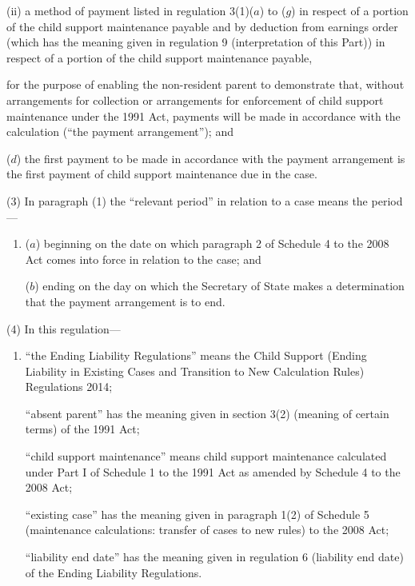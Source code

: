 \documentclass[12pt,a4paper]{article}
\begin{document}
\begin{enumerate}
\begin{enumerate}
    (ii)
    a method of payment listed in regulation 3(1)($a$) to ($g$) in respect of a portion of the child support maintenance payable and by deduction from earnings order (which has the meaning given in regulation 9 (interpretation of this Part)) in respect of a portion of the child support maintenance payable,
\end{enumerate}
    for the purpose of enabling the non-resident parent to demonstrate that, without arrangements for collection or arrangements for enforcement of child support maintenance under the 1991 Act, payments will be made in accordance with the calculation (“the payment arrangement”); and

    ($d$)
    the first payment to be made in accordance with the payment arrangement is the first payment of child support maintenance due in the case.
\end{enumerate}

    (3)
    In paragraph (1) the “relevant period” in relation to a case means the period—
\begin{enumerate}\item[]
    ($a$)
    beginning on the date on which paragraph 2 of Schedule 4 to the 2008 Act comes into force in relation to the case; and

    ($b$)
    ending on the day on which the Secretary of State makes a determination that the payment arrangement is to end.
\end{enumerate}

    (4)
    In this regulation—
\begin{enumerate}\item[]
        “the Ending Liability Regulations” means the Child Support (Ending Liability in Existing Cases and Transition to New Calculation Rules) Regulations 2014;

        “absent parent” has the meaning given in section 3(2) (meaning of certain terms) of the 1991 Act;

        “child support maintenance” means child support maintenance calculated under Part I of Schedule 1 to the 1991 Act as amended by Schedule 4 to the 2008 Act;

        “existing case” has the meaning given in paragraph 1(2) of Schedule 5 (maintenance calculations: transfer of cases to new rules) to the 2008 Act;

        “liability end date” has the meaning given in regulation 6 (liability end date) of 
the Ending Liability Regulations.
\end{enumerate}
\end{document}
